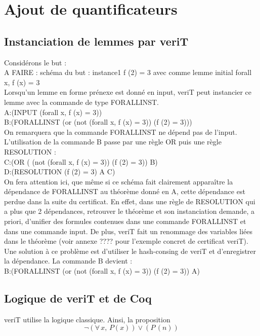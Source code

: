 \documentclass[11pt]{article}
\begin{document}
\newpage
\section{Ajout de quantificateurs}

\subsection{Instanciation de lemmes par veriT}

Considérons le but : \\

A FAIRE : schéma du but : instance1 f (2) = 3 avec comme lemme initial forall x, f (x) = 3 \\

Lorsqu'un lemme en forme prénexe est donné en input, veriT peut instancier ce lemme avec la commande de type FORALLINST. \\

A:(INPUT (forall x, f (x) = 3)) \\
B:(FORALLINST (or (not (forall x, f (x) = 3)) (f (2) = 3))) \\

On remarquera que la commande FORALLINST ne dépend pas de l'input. L'utilisation de la commande B passe par une règle OR puis une règle RESOLUTION : \\ 

C:(OR ( (not (forall x, f (x) = 3)) (f (2) = 3)) B) \\ 
D:(RESOLUTION (f (2) = 3) A C) \\ 

On fera attention ici, que même si ce schéma fait clairement apparaître la dépendance de FORALLINST au théorème donné en A, cette dépendance est perdue dans la suite du certificat. En effet, dans une règle de RESOLUTION qui a plus que 2 dépendances, retrouver le théorème et son instanciation demande, a priori, d'unifier des formules contenues dans une commande FORALLINST et dans une commande input. De plus, veriT fait un renommage des variables liées dans le théorème (voir annexe ???? pour l'exemple concret de certificat veriT). Une solution à ce problème est d'utiliser le hash-consing de veriT et d'enregistrer la dépendance. La commande B devient : \\

B:(FORALLINST (or (not (forall x, f (x) = 3)) (f (2) = 3)) A) 

\subsection{Logique de veriT et de Coq}
veriT utilise la logique classique. Ainsi, la proposition 
\[  \neg (\forall \, x, \, P(x)) \vee (P \, (n)) \]
\end{document}
